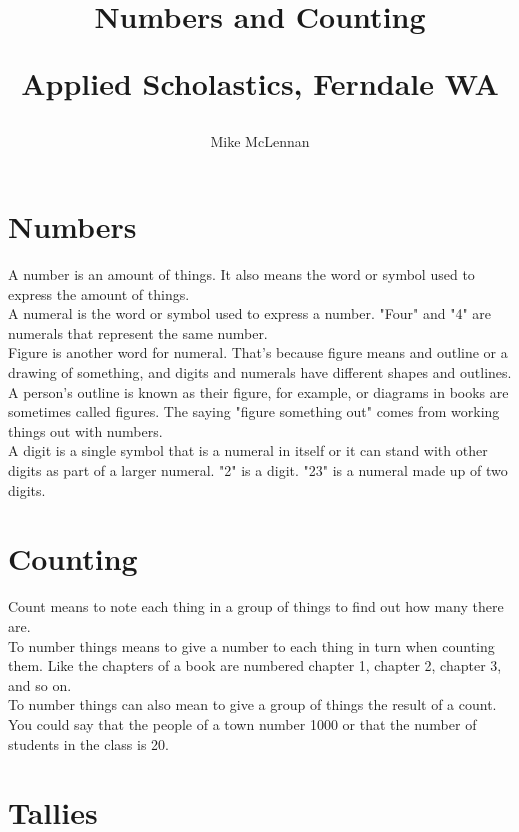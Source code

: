 \documentclass{article}
\author{Mike McLennan}
\date{}
\title{Numbers and Counting\\
\vspace{28pt}
\begin{normalsize}Applied Scholastics, Ferndale WA \end{normalsize}}
\begin{document}
\maketitle
\newpage

\section*{Numbers}

A number is an amount of things. It also means the word or symbol used to express the amount of things.\\

A numeral is the word or symbol used to express a number. "Four" and "4" are numerals that represent the same number.\\

Figure is another word for numeral. That's because figure means and outline or a drawing of something, and digits and numerals have different shapes and outlines. A person's outline is known as their figure, for example, or diagrams in books are sometimes called figures. The saying "figure something out" comes from working things out with numbers.\\

A digit is a single symbol that is a numeral in itself or it can stand with other digits as part of a larger numeral. "2" is a digit. "23" is a numeral made up of two digits.\\

\newpage

\section*{Counting}

Count means to note each thing in a group of things to find out how many there are.\\

To number things means to give a number to each thing in turn when counting them. Like the chapters of a book are numbered chapter 1, chapter 2, chapter 3, and so on.\\

To number things can also mean to give a group of things the result of a count. You could say that the people of a town number 1000 or that the number of students in the class is 20.\\

\section*{Tallies}
\end{document}

